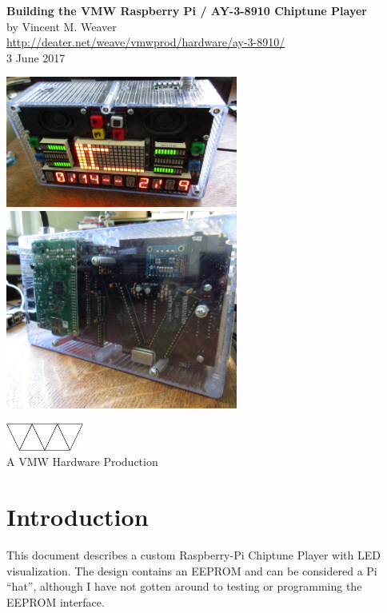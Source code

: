\documentclass[11pt]{article}
\begin{document}
\begin{center}
{\Large \bf Building the VMW Raspberry Pi / AY-3-8910 Chiptune Player}\\[2ex]
by Vincent M. Weaver\\[3ex]
\url{http://deater.net/weave/vmwprod/hardware/ay-3-8910/}\\[3ex]
3 June 2017
\end{center}

\begin{center}
\includegraphics[width=3in]{figs/0377_front_view.jpg}
\includegraphics[width=3in]{figs/0378_back_view.jpg}
\end{center}
\vspace{3ex}
\begin{center}
\includegraphics[width=1in]{figs/vmw}\\
A VMW Hardware Production
\end{center}

\pagebreak

\section{Introduction}

This document describes a custom Raspberry-Pi Chiptune Player with
LED visualization.
The design contains an EEPROM and can be considered a Pi ``hat'', although
I have not gotten around to testing or programming the EEPROM interface.
\end{document}
